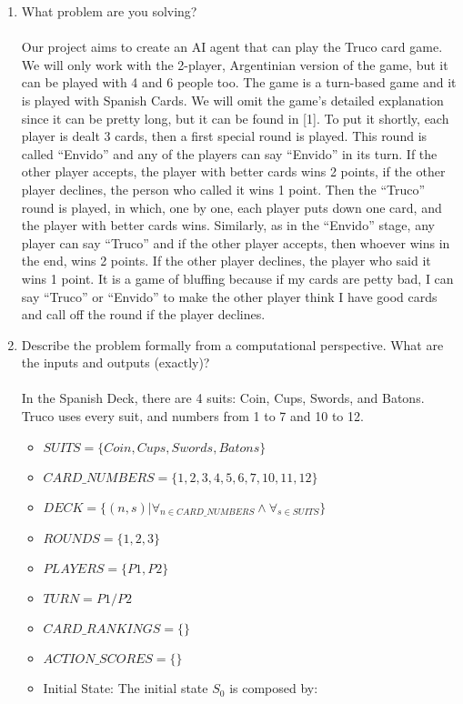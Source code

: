 \documentclass{article}
\begin{document}
\begin{enumerate}
\item What problem are you solving?
\\\\
Our project aims to create an AI agent that can play the Truco card game. We will only work with the 2-player, Argentinian version of the game, but it can be played with 4 and 6 people too. The game is a turn-based game and it is played with Spanish Cards. We will omit the game’s detailed explanation since it can be pretty long, but it can be found in [1]. To put it shortly, each player is dealt 3 cards, then a first special round is played. This round is called “Envido” and any of the players can say “Envido” in its turn. If the other player accepts, the player with better cards wins 2 points, if the other player declines, the person who called it wins 1 point. Then the “Truco” round is played, in which, one by one, each player puts down one card, and the player with better cards wins. Similarly, as in the “Envido” stage, any player can say “Truco” and if the other player accepts, then whoever wins in the end, wins 2 points. If the other player declines, the player who said it wins 1 point. It is a game of bluffing because if my cards are petty bad, I can say “Truco” or “Envido” to make the other player think I have good cards and call off the round if the player declines.
\\
\item Describe the problem formally from a computational perspective. What are the inputs and outputs (exactly)?
\\\\
In the Spanish Deck, there are 4 suits: Coin, Cups, Swords, and Batons. Truco uses every suit, and numbers from 1 to 7 and 10 to 12.
\begin{itemize}
	\item $SUITS = \{Coin, Cups, Swords, Batons\}$
	\item $CARD\_NUMBERS = \{1, 2, 3, 4, 5, 6, 7, 10, 11, 12\}$
	\item $DECK = \{(n, s) | \forall_{n \in CARD\_NUMBERS} \land \forall_{s \in SUITS} \}$
	\item $ROUNDS = \{1, 2, 3\}$
	\item $PLAYERS = \{P1, P2\}$
	\item $TURN = P1/P2$
	\item $CARD\_RANKINGS = \{  \}$
	\item $ACTION\_SCORES = \{  \}$
	\item Initial State: The initial state $S_0$ is composed by:

\end{itemize}
\end{enumerate}
\end{document}
